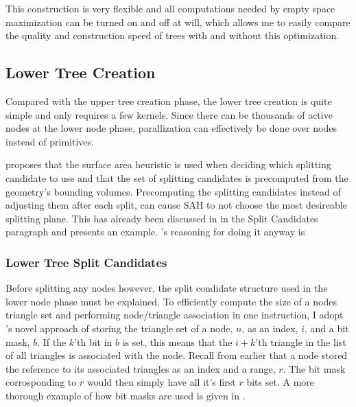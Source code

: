 This construction is very flexible and all computations needed by empty space
maximization can be turned on and off at will, which allows me to easily compare
the quality and construction speed of trees with and without this optimization.

\subsection{Lower Tree Creation}\label{sec:lowerNodes}

Compared with the upper tree creation phase, the lower tree creation is quite
simple and only requires a few kernels. Since there can be thousands of active
nodes at the lower node phase, parallization can effectively be done over nodes
instead of primitives.


\zhou{} proposes that the surface area heuristic is used when deciding which
splitting candidate to use and that the set of splitting candidates is
precomputed from the geometry's bounding volumes. Precomputing the splitting
candidates instead of adjusting them after each split, can cause SAH to not
choose the most desireable splitting plane. This has already been discussed in
 in the Split Candidates paragraph and
 presents an example. \zhou's reasoning for doing it
anyway is



\subsubsection{Lower Tree Split Candidates}


Before splitting any nodes however, the split condidate structure used in the
lower node phase must be explained. To efficiently compute the size of a nodes
triangle set and performing node/triangle association in one instruction, I
adopt \zhou's novel approach of storing the triangle set of a node, $n$, as an
index, $i$, and a bit mask, $b$. If the $k$'th bit in $b$ is set, this means
that the $i+k$'th triangle in the list of all triangles is associated with the
node. Recall from earlier that a node stored the reference to its associated
triangles as an index and a range, $r$. The bit mask corrosponding to $r$ would
then simply have all it's first $r$ bits set. A more thorough example of how bit
masks are used is given in .

